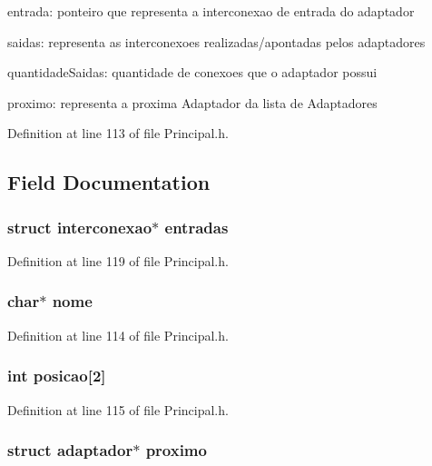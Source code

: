 entrada\-: ponteiro que representa a interconexao de entrada do adaptador

saidas\-: representa as interconexoes realizadas/apontadas pelos adaptadores

quantidade\-Saidas\-: quantidade de conexoes que o adaptador possui

proximo\-: representa a proxima Adaptador da lista de Adaptadores 

Definition at line 113 of file Principal.\-h.



\subsection{Field Documentation}
\hypertarget{structadaptador_ae28777a0a252764c89fe126c8d7fba4a}{
\subsubsection[{entradas}]{\setlength{\rightskip}{0pt plus 5cm}struct {\bf interconexao}$\ast$ entradas}}\label{structadaptador_ae28777a0a252764c89fe126c8d7fba4a}


Definition at line 119 of file Principal.\-h.

\hypertarget{structadaptador_ae2a0f66178bb1c4d42e2b70ec9426ccb}{
\subsubsection[{nome}]{\setlength{\rightskip}{0pt plus 5cm}char$\ast$ nome}}\label{structadaptador_ae2a0f66178bb1c4d42e2b70ec9426ccb}


Definition at line 114 of file Principal.\-h.

\hypertarget{structadaptador_a7e30d633898517077a4363ad6fade5b6}{
\subsubsection[{posicao}]{\setlength{\rightskip}{0pt plus 5cm}int posicao\mbox{[}2\mbox{]}}}\label{structadaptador_a7e30d633898517077a4363ad6fade5b6}


Definition at line 115 of file Principal.\-h.

\hypertarget{structadaptador_a13b5e7e3587fb01bede3f317405b5af2}{
\subsubsection[{proximo}]{\setlength{\rightskip}{0pt plus 5cm}struct {\bf adaptador}$\ast$ proximo}}\label{structadaptador_a13b5e7e3587fb01bede3f317405b5af2}


